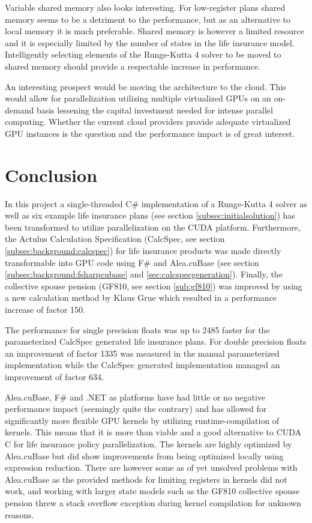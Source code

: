 Variable shared memory also looks interesting. For low-register plans shared memory seems to be a detriment to the performance, but as an alternative to local memory it is much preferable.
Shared memory is however a limited resource and it is especially limited by the number of states in the life insurance model.
Intelligently selecting elements of the Runge-Kutta 4 solver to be moved to shared memory should provide a respectable increase in performance.

An interesting prospect would be moving the architecture to the cloud.
This would allow for parallelization utilizing multiple virtualized GPUs on an on-demand basis lessening the capital investment needed for intense parallel computing.
Whether the current cloud providers provide adequate virtualized GPU instances is the question and the performance impact is of great interest.

\section{Conclusion}
In this project a single-threaded C\# implementation of a Runge-Kutta 4 solver as well as six example life insurance plans (see section \ref{subsec:initialsolution}) has been transformed to utilize parallelization on the CUDA platform.
Furthermore, the Actulus Calculation Specification (CalcSpec, see section \ref{subsec:background:calcspec}) for life insurance products was made directly transformable into GPU code using F\# and Alea.cuBase (see section \ref{subsec:background:fsharpcubase} and \ref{sec:calcspecgeneration}).
Finally, the collective spouse pension (GF810, see section \ref{sub:gf810}) was improved by using a new calculation method by Klaus Grue which resulted in a performance increase of factor 150.

The performance for single precision floats was up to 2485 faster for the parameterized CalcSpec generated life insurance plans.
For double precision floats an improvement of factor 1335 was measured in the manual parameterized implementation while the CalcSpec generated implementation managed an improvement of factor 634.

Alea.cuBase, F\# and .NET as platforms have had little or no negative performance impact (seemingly quite the contrary) and has allowed for significantly more flexible GPU kernels by utilizing runtime-compilation of kernels.
This means that it is more than viable and a good alternative to CUDA C for life insurance policy parallelization.
The kernels are highly optimized by Alea.cuBase but did show improvements from being optimized locally using expression reduction.
There are however some as of yet unsolved problems with Alea.cuBase as the provided methods for limiting registers in kernels did not work, and working with larger state models such as the GF810 collective spouse pension threw a stack overflow exception during kernel compilation for unknown reasons.

\clearpage